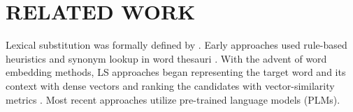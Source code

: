 \section{RELATED WORK}
\label{sec:related}

Lexical substitution was formally defined by \citet{mccarthy2002lexical}.
Early approaches used rule-based heuristics and synonym lookup in word thesauri \citep{hassan2007unt}.
With the advent of word embedding methods,
LS approaches began representing the target word and its context with dense vectors and ranking the candidates with vector-similarity metrics \citep{roller2016pic}. Most recent approaches utilize pre-trained language models (PLMs). 

